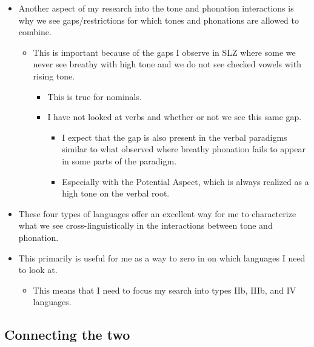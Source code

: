 \begin{itemize}
    \item Another aspect of my research into the tone and phonation interactions is why we see gaps/restrictions for which tones and phonations are allowed to combine. 
    \begin{itemize}
        \item This is important because of the gaps I observe in SLZ where some we never see breathy with high tone and we do not see checked vowels with rising tone. 
        \begin{itemize}
            \item This is true for nominals. 
            \item I have not looked at verbs and whether or not we see this same gap. 
            \begin{itemize}
                \item I expect that the gap is also present in the verbal paradigms similar to what \citet{uchiharaToneRegistrogenesisQuiavini2016} observed where breathy phonation fails to appear in some parts of the paradigm.
                \item Especially with the Potential Aspect, which is always realized as a high tone on the verbal root. 
            \end{itemize}
        \end{itemize}
    \end{itemize}
    \item These four types of languages offer an excellent way for me to characterize what we see cross-linguistically in the interactions between tone and phonation. 
    \item This primarily is useful for me as a way to zero in on which languages I need to look at. 
    \begin{itemize}
        \item This means that I need to focus my search into types IIb, IIIb, and IV languages.
    \end{itemize}
\end{itemize}

\subsection{Connecting the two} \label{sec:Connection}

